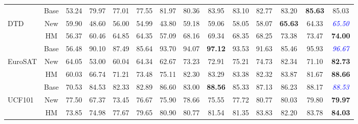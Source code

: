 \documentclass[11pt]{article}
\begin{document}
\begin{table}[htbp]
{\begin{tabular}{lc|ccccccccccc|c}
 \midrule
 & Base&  53.24&79.97& 77.01& 77.55& 81.97& 80.36& 83.95& 83.10& 82.77& 83.20& \textbf{85.63}&85.03\\
 DTD& New&  59.90&48.60& 56.00& 54.99& 43.80& 59.18& 59.06& 58.05& 58.07& \textbf{65.63}& 64.33&\textcolor{blue}{\textit{65.50}}\\
 & HM&  56.37&60.46& 64.85& 64.35& 57.09& 68.16& 69.34& 68.35& 68.25& 73.38& 73.47&\textbf{74.00}\\
 \midrule
 & Base&  56.48&90.10& 87.49& 85.64& 93.70& 94.07& \textbf{97.12}& 93.53& 91.63& 85.46& 95.93&\textcolor{blue}{\textit{96.67}}\\
 EuroSAT& New&  64.05&53.00& 60.04& 64.34& 62.67& 73.23& 72.91& 75.21& 74.73& 82.34& 71.10&\textbf{82.73}\\
 & HM&  60.03&66.74& 71.21& 73.48& 75.11& 82.30& 83.29& 83.38& 82.32& 83.87& 81.67&\textbf{88.66}\\
 \midrule
 & Base&  70.53&84.53& 82.33& 82.89& 86.60& 83.00& \textbf{88.56}& 85.33& 87.13& 86.23& 88.17&\textcolor{blue}{\textit{88.53}}\\
 UCF101& New&  77.50&67.37& 73.45& 76.67& 75.90& 78.66& 75.55& 77.72& 80.77& 80.03& 79.80&\textbf{79.97}\\
 & HM&  73.85&74.98& 77.67& 79.65& 80.90& 80.77& 81.54& 81.35& 83.83& 82.20& 83.78&\textbf{84.03}\\
    \bottomrule
    \end{tabular}
}
\end{table}
\end{document}
